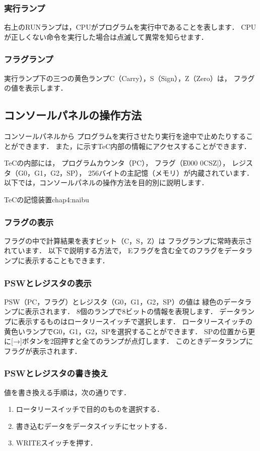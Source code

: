 \subsubsection{実行ランプ}
右上のRUNランプは，CPUがプログラムを実行中であることを表します．
CPUが正しくない命令を実行した場合は点滅して異常を知らせます．

\subsubsection{フラグランプ}
実行ランプ下の三つの黄色ランプC（Carry），S（Sign），Z（Zero）は，
フラグの値を表示します．

\subsection{コンソールパネルの操作方法}
\label{operation}
コンソールパネルから
プログラムを実行させたり実行を途中で止めたりすることができます．
また，に示すTeC内部の情報にアクセスすることができます．

TeCの内部には，
プログラムカウンタ（PC），
フラグ（\|E000 0CSZ|），
レジスタ（G0，G1，G2，SP），
256バイトの主記憶（メモリ）が内蔵されています．
以下では，コンソールパネルの操作方法を目的別に説明します．

          {TeCの記憶装置}{chap4:naibu}

\subsubsection{フラグの表示}
フラグの中で計算結果を表すビット（C，S，Z）は
フラグランプに常時表示されています．
以下で説明する方法で，
Eフラグを含む全てのフラグをデータランプに表示することもできます．

\subsubsection{PSWとレジスタの表示}
PSW（PC，フラグ）とレジスタ（G0，G1，G2，SP）の値は
緑色のデータランプに表示されます．
8個のランプで8ビットの情報を表現します．
データランプに表示するものはロータリースイッチで選択します．
ロータリースイッチの黄色いランプでG0，G1，G2，SPを選択することができます．
SPの位置から更に[→]ボタンを2回押すと全てのランプが点灯します．
このときデータランプにフラグが表示されます．
\vspace{0.3cm}

\subsubsection{PSWとレジスタの書き換え}
値を書き換える手順は，次の通りです．
\begin{enumerate}
\item ロータリースイッチで目的のものを選択する．
\item 書き込むデータをデータスイッチにセットする．
\item WRITEスイッチを押す．
\end{enumerate}

